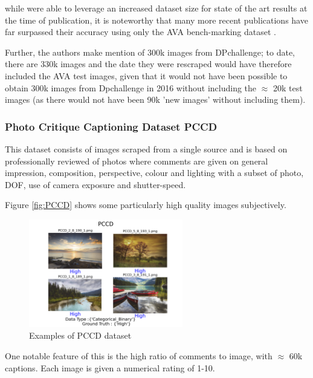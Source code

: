 while \citeauthor{Lu2014a}\cite{Lu2014a} were able to leverage an increased dataset size for state of the art results at the time of publication, it is noteworthy that many more recent publications have far surpassed their accuracy using only the AVA bench-marking dataset \cite{Zhang2021d,Ma2017,She_2021_CVPR,Kong2016,Jin2016}. 

Further, the authors make mention of 300k images from DPchallenge; to date, there are 330k images and the date they were rescraped would have therefore included the AVA test images, given that it would not have been possible to obtain 300k images from Dpchallenge in 2016 without including the $\approx$ 20k test images (as there would not have been 90k 'new images' without including them).  


\subsubsection{Photo Critique Captioning Dataset PCCD}

This dataset consists of images scraped from a single source \cite{Chang2017,guru} and is based on professionally reviewed of photos where comments are given on general impression, composition,  perspective, colour and lighting with a subset of photo, DOF, use of camera exposure and shutter-speed. 

Figure \ref{fig:PCCD} shows some particularly high quality images subjectively.
\begin{figure}[hp]
\centering
 \includegraphics[width=0.6\textwidth]{figures/database_ims/PCCD.png}
  \caption{\label{fig:PCCD} Examples of PCCD dataset}
  \label{fig:PCCD_}
\end{figure}

 One notable feature of this is the high ratio of comments to image, with $\approx$ 60k captions. Each image is given a numerical rating of 1-10. 

